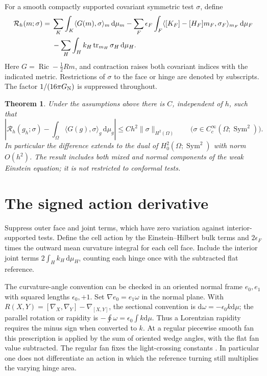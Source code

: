 \documentclass[11pt]{article}
\newtheorem{theorem}{Theorem}
\newcommand{\dd}{\mathrm d}
\newcommand{\Ric}{\operatorname{Ric}}
\newcommand{\tr}{\operatorname{tr}}
\newcommand{\Reg}{\mathcal R}
\begin{document}
For a smooth compactly supported covariant symmetric test \(\sigma\), define
\begin{align}
 \Reg_h(m;\sigma)
={}&\sum_K\int_K\langle G(m),\sigma\rangle_m\,\dd\mu_m
 -\sum_F\epsilon_F\int_F
 \langle[K_F]-[H_F]m_F,\sigma_F\rangle_{m_F}\,\dd\mu_F \notag\\
 &-\sum_H\int_H k_H\tr_{m_H}\sigma_H\,\dd\mu_H .
 \label{eq:residual}
\end{align}
Here \(G=\Ric-\frac12 Rm\), and contraction raises both covariant indices with the indicated metric. Restrictions of \(\sigma\) to the face or hinge are denoted by subscripts. The factor \(1/(16\pi G_{\rm N})\) is suppressed throughout.

\begin{theorem}\label{thm:main}
Under the assumptions above there is \(C\), independent of \(h\), such that
\[
 \left|\Reg_h(g_h;\sigma)-
 \int_\Omega \langle G(g),\sigma\rangle_g\,\dd\mu_g\right|
 \leq C h^2\|\sigma\|_{H^2(\Omega)}
 \qquad\bigl(\sigma\in C_c^\infty(\Omega;\operatorname{Sym}^2)\bigr).
\]
In particular the difference extends to the dual of \(H^2_0(\Omega;\operatorname{Sym}^2)\) with norm \(O(h^2)\). The result includes both mixed and normal components of the weak Einstein equation; it is not restricted to conformal tests.
\end{theorem}

\section{The signed action derivative}
Suppress outer face and joint terms, which have zero variation against interior-supported tests. Define the cell action by the Einstein--Hilbert bulk terms and \(2\epsilon_F\) times the outward mean curvature integral for each cell face. Include the interior joint terms \(2\int_H k_H\,\dd\mu_H\), counting each hinge once with the subtracted flat reference.

The curvature-angle convention can be checked in an oriented normal frame \(e_0,e_1\) with squared lengths \(\epsilon_0,+1\). Set \(\nabla e_0=e_1\omega\) in the normal plane. With \(R(X,Y)=[\nabla_X,\nabla_Y]-\nabla_{[X,Y]}\), the sectional convention is \(\dd\omega=-\epsilon_0 k\dd\mu\); the parallel rotation or rapidity is \(-\oint\omega=\epsilon_0\int k\dd\mu\). Thus a Lorentzian rapidity requires the minus sign when converted to \(k\). At a regular piecewise smooth fan this prescription is applied by the sum of oriented wedge angles, with the flat fan value subtracted. The regular fan fixes the light-crossing constants \cite[Sec.~9]{Sorkin}\cite[Sec.~II and App.~A]{Asante}. In particular one does not differentiate an action in which the reference turning still multiplies the varying hinge area.
\end{document}
